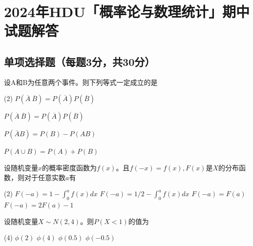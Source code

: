\chapter*{2024年\textsf{HDU}「概率论与数理统计」期中试题解答}


\section{单项选择题（每题3分，共30分）}

\begin{problem}
    设A和B为任意两个事件。则下列等式一定成立的是
    \begin{tasks}(2)
        \task $P(\overline A\ \overline B)=P(\overline A)P(\overline B)$
    
        \task $P(\overline A\ \overline B) = P(\overline A) P(\overline B)$
    
        \task $P(\overline AB)=P(B)-P(AB)$
    
        \task $P(A\cup B) = P(A) + P(B)$
    \end{tasks}
\end{problem}
\begin{solution}

\end{solution}

\begin{problem}
    设随机变量$x$的概率密度函数为$f(x)$。且$f(-x)=f(x),F(x)$是$X$的分布函数，则对于任意实数$a$有
    \begin{tasks}(2)
        \task$F(-a)=1-\int_{0}^{a}f(x)dx$
        \task$F(-a)=1/2-\int_{0}^{a}f(x)dx$
        \task$F(-a)=F(a)$
        \task$F(-a)=2F(a)-1$
    \end{tasks}
\end{problem}
\begin{solution}

\end{solution}

\begin{problem}
    设随机变量$X\sim N(2,4)$。则$P(X<1)$的值为
    \begin{tasks}(4)
        \task$\phi(2)$
        \task$\phi(4)$
        \task$\phi(0.5)$
        \task$\phi(-0.5)$
    \end{tasks}
\end{problem}
\begin{solution}

\end{solution}

